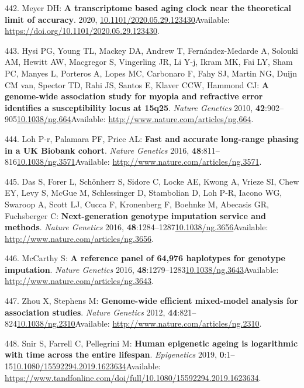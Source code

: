 \documentclass[
]{book}
\begin{document}
\leavevmode\hypertarget{ref-Meyer2020}{}%
442. Meyer DH: \textbf{A transcriptome based aging clock near the theoretical limit of accuracy}. 2020, \href{https://doi.org/10.1101/2020.05.29.123430}{10.1101/2020.05.29.123430}Available: \url{https://doi.org/10.1101/2020.05.29.123430}.

\leavevmode\hypertarget{ref-Hysi2010}{}%
443. Hysi PG, Young TL, Mackey DA, Andrew T, Fernández-Medarde A, Solouki AM, Hewitt AW, Macgregor S, Vingerling JR, Li Y-j, Ikram MK, Fai LY, Sham PC, Manyes L, Porteros A, Lopes MC, Carbonaro F, Fahy SJ, Martin NG, Duijn CM van, Spector TD, Rahi JS, Santos E, Klaver CCW, Hammond CJ: \textbf{A genome-wide association study for myopia and refractive error identifies a susceptibility locus at 15q25}. \emph{Nature Genetics} 2010, \textbf{42}:902--905\href{https://doi.org/10.1038/ng.664}{10.1038/ng.664}Available: \url{http://www.nature.com/articles/ng.664}.

\leavevmode\hypertarget{ref-Loh2016}{}%
444. Loh P-r, Palamara PF, Price AL: \textbf{Fast and accurate long-range phasing in a UK Biobank cohort}. \emph{Nature Genetics} 2016, \textbf{48}:811--816\href{https://doi.org/10.1038/ng.3571}{10.1038/ng.3571}Available: \url{http://www.nature.com/articles/ng.3571}.

\leavevmode\hypertarget{ref-Das2016}{}%
445. Das S, Forer L, Schönherr S, Sidore C, Locke AE, Kwong A, Vrieze SI, Chew EY, Levy S, McGue M, Schlessinger D, Stambolian D, Loh P-R, Iacono WG, Swaroop A, Scott LJ, Cucca F, Kronenberg F, Boehnke M, Abecasis GR, Fuchsberger C: \textbf{Next-generation genotype imputation service and methods}. \emph{Nature Genetics} 2016, \textbf{48}:1284--1287\href{https://doi.org/10.1038/ng.3656}{10.1038/ng.3656}Available: \url{http://www.nature.com/articles/ng.3656}.

\leavevmode\hypertarget{ref-McCarthy2017}{}%
446. McCarthy S: \textbf{A reference panel of 64,976 haplotypes for genotype imputation}. \emph{Nature Genetics} 2016, \textbf{48}:1279--1283\href{https://doi.org/10.1038/ng.3643}{10.1038/ng.3643}Available: \url{http://www.nature.com/articles/ng.3643}.

\leavevmode\hypertarget{ref-Zhou2012a}{}%
447. Zhou X, Stephens M: \textbf{Genome-wide efficient mixed-model analysis for association studies}. \emph{Nature Genetics} 2012, \textbf{44}:821--824\href{https://doi.org/10.1038/ng.2310}{10.1038/ng.2310}Available: \url{http://www.nature.com/articles/ng.2310}.

\leavevmode\hypertarget{ref-Snir2019}{}%
448. Snir S, Farrell C, Pellegrini M: \textbf{Human epigenetic ageing is logarithmic with time across the entire lifespan}. \emph{Epigenetics} 2019, \textbf{0}:1--15\href{https://doi.org/10.1080/15592294.2019.1623634}{10.1080/15592294.2019.1623634}Available: \url{https://www.tandfonline.com/doi/full/10.1080/15592294.2019.1623634}.
\end{document}
